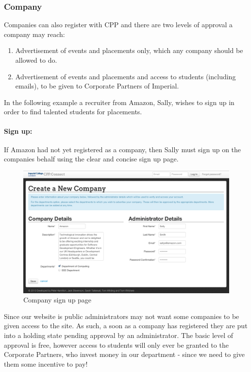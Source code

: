 \subsubsection{Company}
Companies can also register with CPP and there are two levels of approval a company may reach:
  \begin{enumerate}
    \item Advertisement of events and placements only, which any company should be allowed to do.
    \item Advertisement of events and placements and access to students (including emails), to be given to Corporate Partners of Imperial.
  \end{enumerate}
  In the following example a recruiter from Amazon, Sally, wishes to sign up in order to find talented students for placements.
  \paragraph{Sign up:}
    If Amazon had not yet registered as a company, then Sally must sign up on the companies behalf using the clear and concise sign up page.

    \begin{figure}[H]\centering
    \includegraphics[scale=0.3]{images/user_experiences/company/amazon_signup}
    \caption{Company sign up page}
    \end{figure}

    Since our website is public administrators may not want some companies to be given access to the site. As such, a soon as a company has registered they are put into a holding state pending approval by an administrator.
    The basic level of approval is free, however access to students will only ever be granted to the Corporate Partners, who invest money in our department - since we need to give them some incentive to pay!

